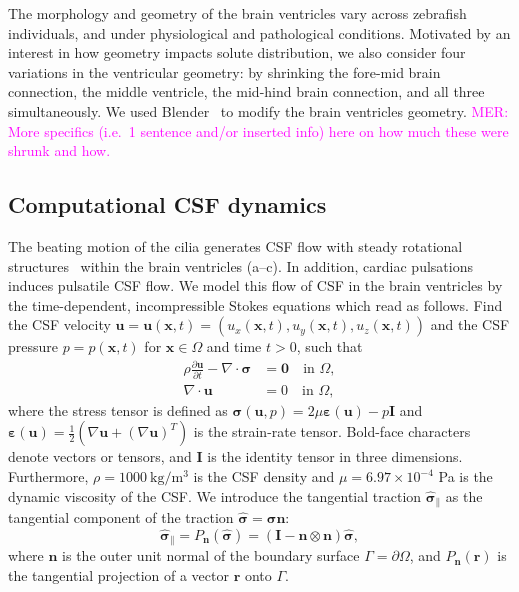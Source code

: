 \documentclass[fleqn]{wlscirep}
\newcommand{\pdifft}[1]{\frac{\partial  #1}{\partial t}}
\newcommand{\nn}{\mathbf{n}}
\newcommand{\rr}{\mathbf{r}}
\newcommand{\uu}{\mathbf{u}}
\newcommand{\xx}{\bm{x}}
\newcommand{\bsig}{\bm{\sigma}}
\newcommand{\bsigpar}{\hat{\bsig}_{\parallel}}
\newcommand{\beps}{\bm{\varepsilon}}
\newcommand{\mer}[1]{\textcolor{magenta}{#1}}
\begin{document}
The morphology and geometry of the brain ventricles vary across zebrafish individuals, and under physiological and pathological conditions. 
Motivated by an interest in how geometry impacts solute distribution, we also consider four variations in the ventricular geometry: by shrinking the fore-mid brain connection, 
the middle ventricle, the mid-hind brain connection, and all three simultaneously. 
We used Blender~\cite{Community2018BlenderPackage} to modify the brain ventricles geometry. \mer{MER: More specifics (i.e.~1 sentence and/or inserted info) here on how much these were shrunk and how.}

\subsection*{Computational CSF dynamics}
The beating motion of the cilia generates CSF flow with steady rotational structures~\cite{Olstad2019CiliaryDevelopment} within the brain ventricles (a--c).
In addition, cardiac pulsations induces pulsatile CSF flow. We model this flow of CSF in the brain ventricles by the time-dependent, incompressible Stokes equations which read as follows.
Find the CSF velocity $\uu = \uu(\xx, t) = (u_x(\xx, t), u_y(\xx, t), u_z(\xx, t))$ and the CSF pressure $p = p(\xx, t)$ for $\xx \in \Omega$ and time $t>0$, such that
\begin{subequations}
    \begin{align}
      \rho \pdifft{\uu} - \nabla \cdot \bsig &= \mathbf{0}
      \quad \text{in } \Omega,
      \label{eq:stokes_eq_mom}\\
      \nabla \cdot \uu &= 0
      \quad  \text{in } \Omega,
  \end{align}
  \label{eq:stokes_eqs}%
\end{subequations}%
where the stress tensor is defined as $\bsig(\uu, p) = 2\mu\beps(\uu) - p\mathbf{I}$ and $\beps(\uu) = \frac{1}{2}\left(\nabla \uu + (\nabla\uu)^T\right)$ is the strain-rate tensor. 
Bold-face characters denote vectors or tensors, and $\mathbf{I}$ is the identity tensor in three dimensions. Furthermore, $\rho=1000 \ \mathrm{kg/m^3}$ is the CSF density and $\mu=6.97\times 10^{-4}$ Pa is the dynamic viscosity of the CSF.
We introduce the tangential traction $\bsigpar$ as the tangential component of the traction $\hat{\bsig}=\bsig\nn$:
\begin{equation*}
    \bsigpar = P_{\nn}(\hat{\bsig}) = (\mathbf{I} - \nn\otimes\nn)\hat{\bsig},
\end{equation*}
where $\nn$ is the outer unit normal of the boundary surface $\Gamma = \partial\Omega$, and $P_{\nn}(\rr)$ is the tangential  projection of a vector $\rr$ onto $\Gamma$.
\end{document}
